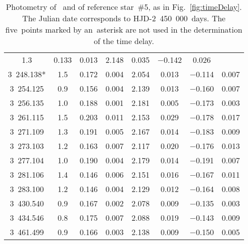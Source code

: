 \begin{table}[H]
\begin{tabular}{cccccccc}
1.3 & 0.133 & 0.013 & 2.148 & 0.035 & $-$0.142 & 0.026 \\ 3~248.138* & 1.5 & 0.172 & 0.004 & 2.054 & 0.013 & $-$0.114 & 0.007 \\ 3~254.125 & 0.9 & 0.156 & 0.004 & 2.139 & 0.013 & $-$0.160 & 0.007 \\ 3~256.135 & 1.0 & 0.188 & 0.001 & 2.181 & 0.005 & $-$0.173 & 0.003 \\ 3~261.115 & 1.5 & 0.203 & 0.011 & 2.153 & 0.029 & $-$0.178 & 0.017 \\ 3~271.109 & 1.3 & 0.191 & 0.005 & 2.167 & 0.014 & $-$0.183 & 0.009 \\ 3~273.103 & 1.2 & 0.163 & 0.007 & 2.117 & 0.020 & $-$0.176 & 0.013 \\ 3~277.104 & 1.0 & 0.190 & 0.004 & 2.179 & 0.014 & $-$0.191 & 0.007 \\ 3~281.106 & 1.4 & 0.146 & 0.006 & 2.151 & 0.016 & $-$0.167 & 0.011 \\ 3~283.100 & 1.2 & 0.146 & 0.004 & 2.129 & 0.012 & $-$0.164 & 0.008 \\ 3~430.540 & 0.9 & 0.167 & 0.002 & 2.078 & 0.009 & $-$0.135 & 0.003 \\ 3~434.546 & 0.8 & 0.175 & 0.007 & 2.088 & 0.019 & $-$0.143 & 0.009 \\ 3~461.499 & 0.9 & 0.166 & 0.003 & 2.138 & 0.009 & $-$0.150 & 0.005 \\        \hline
\end{tabular} 
	\caption{Photometry of \obj\ and of reference star~\#5, as in Fig.~\ref{fig:timeDelay}. The Julian date corresponds to HJD-2~450~000~days. The five~points marked by an~asterisk are not used in the determination of the time delay.} 
\end{table} 
